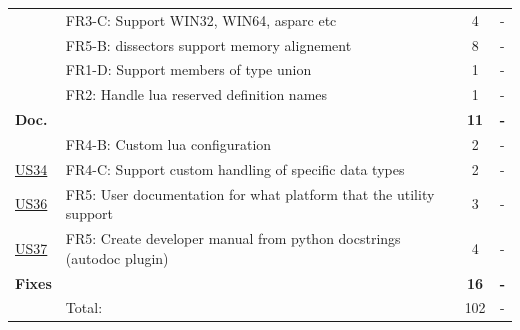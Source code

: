\begin{table}[!htb]
\begin{tabularx}{\textwidth}{l X c c}
	 & FR3-C: Support WIN32, WIN64, \gls{asparc} etc & 4 & - \\
	 & FR5-B: \Glspl{dissector} support memory alignement & 8 & - \\
	 & FR1-D: Support members of type \gls{union} & 1 & - \\
	 & FR2: Handle \Gls{lua} reserved definition names & 1 & - \\
	\addlinespace
	\textbf{Doc.} &  & \textbf{11} & \textbf{-} \\
	 & FR4-B: Custom \Gls{lua} configuration & 2 & - \\
	\hyperref[tab:req:stories8]{US34} & FR4-C: Support custom handling of specific data types & 2 & - \\
	\hyperref[tab:req:stories9]{US36} & FR5: User documentation for what platform that the \gls{utility} support & 3 & - \\
	\hyperref[tab:req:stories9]{US37} & FR5: Create developer manual from python docstrings (autodoc plugin) & 4 & - \\
	\addlinespace
	\textbf{Fixes} &  & \textbf{16} & \textbf{-} \\
	\midrule
	& Total: & 102 &  -\\
	\bottomrule
\end{tabularx}
\end{table}


